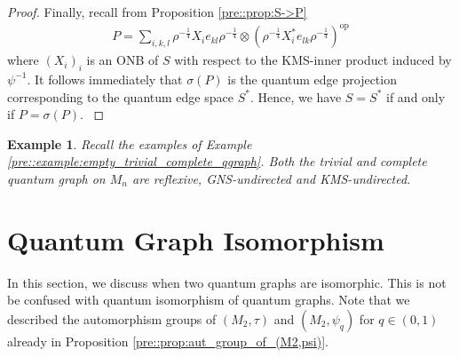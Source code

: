 \documentclass{amsart}
\newtheorem{example}[thm]{Example}
\DeclareMathOperator{\op}{op}
\begin{document}
\begin{proof}
{    Finally, recall from Proposition \ref{pre::prop:S->P}
    \begin{align*}
        P =
        \sum_{i,k,l}\rho^{-\frac{1}{4}}X_ie_{kl}\rho^{-\frac{1}{4}}\otimes
        \left(\rho^{-\frac{1}{4}}X_i^*e_{lk}\rho^{-\frac{1}{4}}\right)^{\op}
    \end{align*}
    where $(X_i)_i$ is an ONB of $S$ with respect to the KMS-inner product induced by $\psi^{-1}$. It follows immediately that $\sigma(P)$ is the quantum edge projection corresponding to the quantum edge space $S^*$. Hence, we have $S=S^*$ if and only if $P = \sigma(P)$.
}
\end{proof}


\begin{example}
\label{pre::example:properties}
Recall the examples of Example \ref{pre::example:empty_trivial_complete_qgraph}. Both the trivial and complete quantum graph on $M_n$ are reflexive, GNS-undirected and KMS-undirected.
\end{example}




\section{Quantum Graph Isomorphism}
\label{sec::qgraph_isomorphism}


In this section, we discuss when two quantum graphs are isomorphic. This is not be confused with quantum isomorphism of quantum graphs.
Note that we described the automorphism groups of $(M_2, \tau)$ and $(M_2, \psi_q)$ for $q \in (0,1)$ already in Proposition \ref{pre::prop:aut_group_of_(M2,psi)}. 
\end{document}
